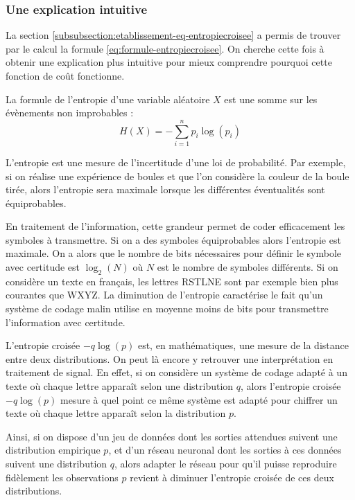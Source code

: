 \subsubsection{Une explication intuitive}

La section \ref{subsubsection:etablissement-eq-entropiecroisee} a permis de trouver par le calcul la formule \ref{eq:formule-entropiecroisee}.
On cherche cette fois à obtenir une explication plus intuitive pour mieux comprendre pourquoi cette fonction de coût fonctionne.

La formule de l'entropie d'une variable aléatoire $X$ est une somme sur les évènements non improbables :
\begin{equation}
 H(X) = -\sum_{i=1}^{n} p_i\log\left(p_i\right)
\end{equation}

L'entropie est une mesure de l'incertitude d'une loi de probabilité. Par exemple, si on réalise une expérience de boules et que l'on considère
la couleur de la boule tirée, alors l'entropie sera maximale lorsque les différentes éventualités sont équiprobables.

En traitement de l'information, cette grandeur permet de coder efficacement les symboles à transmettre. Si on a des symboles équiprobables alors
l'entropie est maximale. On a alors que le nombre de bits nécessaires pour définir le symbole avec certitude est $\log_2\left(N\right)$ où $N$ est le nombre
de symboles différents. Si on considère un texte en français, les lettres RSTLNE sont par exemple bien plus courantes que WXYZ. La diminution de l'entropie
caractérise le fait qu'un système de codage malin utilise en moyenne moins de bits pour transmettre l'information avec certitude.

L'entropie croisée $-q\log\left(p\right)$ est, en mathématiques, une mesure de la distance entre deux distributions. On peut là encore y retrouver une interprétation
en traitement de signal. En effet, si on considère un système de codage adapté à un texte où chaque lettre apparaît selon une distribution $q$, alors
l'entropie croisée $-q\log\left(p\right)$ mesure à quel point ce même système est adapté pour chiffrer un texte où chaque lettre apparaît selon la distribution $p$.

Ainsi, si on dispose d'un jeu de données dont les sorties attendues suivent une distribution empirique $p$, et d'un réseau neuronal dont les sorties
à ces données suivent une distribution $q$, alors adapter le réseau pour qu'il puisse reproduire fidèlement les observations $p$ revient 
à diminuer l'entropie croisée de ces deux distributions.

